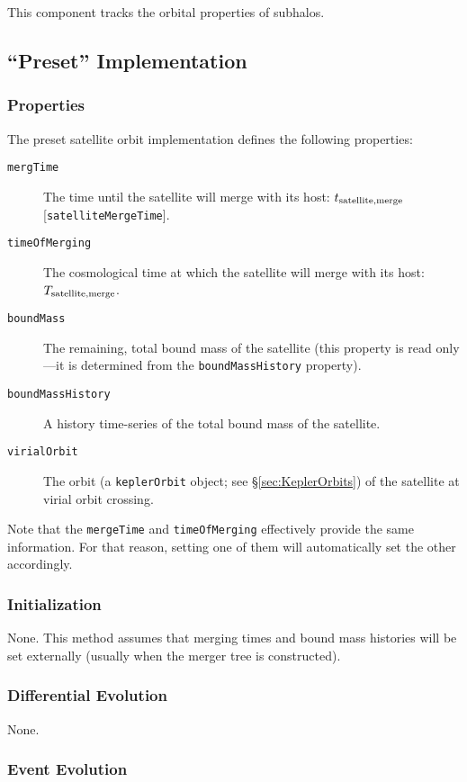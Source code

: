 This \gls{component} tracks the orbital properties of subhalos.

\subsection{``Preset'' Implementation}

\subsubsection{Properties}

The preset satellite orbit implementation defines the following properties:
\begin{description}
 \item [{\tt mergTime}] The time until the satellite will merge with its host: $t_{\rm satellite, merge}$ [{\tt satelliteMergeTime}].
 \item [{\tt timeOfMerging}] The cosmological time at which the satellite will merge with its host: $T_{\rm satellite, merge}$.
 \item [{\tt boundMass}] The remaining, total bound mass of the satellite (this property is read only---it is determined from the {\tt boundMassHistory} property).
 \item [{\tt boundMassHistory}] A history time-series of the total bound mass of the satellite.
 \item [{\tt virialOrbit}] The orbit (a {\tt keplerOrbit} object; see \S\ref{sec:KeplerOrbits}) of the satellite at virial orbit crossing.
\end{description}

Note that the {\tt mergeTime} and {\tt timeOfMerging} effectively provide the same information. For that reason, setting one of them will automatically set the other accordingly.

\subsubsection{Initialization}

None. This method assumes that merging times and bound mass histories will be set externally (usually when the merger tree is constructed).

\subsubsection{Differential Evolution}

None.

\subsubsection{Event Evolution}

